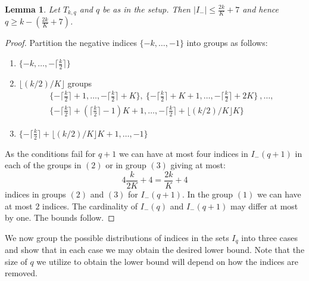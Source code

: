 \documentclass[11pt]{article}
\newtheorem{lemma}[theorem]{Lemma}
\begin{document}
\begin{lemma}\label{lem:belowsmall} Let $T_{k,q}$ and $q$ be as in the setup.
Then  $|I_-|\leq \frac{2k}{K}+7$ and hence
$q\geq k-(\frac{2k}{K}+7)$.
\end{lemma}
\begin{proof}
Partition  the negative indices $\{-k,\ldots, -1\}$  into groups  as follows:
\begin{enumerate}
\item $\{-k,\ldots, -\lceil \frac k2\rceil\}$
\item $\lfloor (k/2)/K\rfloor$ groups 
\begin{align*}\{-\lceil \frac k2\rceil+1,\ldots, -\lceil \frac k2\rceil+K\},\ 
 \{-\lceil \frac k2\rceil+K+1,\ldots, -\lceil \frac k2\rceil+2K\} \ 
 ,\ldots, \\ 
 \{-\lceil \frac k2\rceil+(\lceil \frac k2\rceil -1)K+1,\ldots, -\lceil \frac k2\rceil+ \lfloor (k/2)/K\rfloor K\}
 \end{align*}
\item $\{-\lceil \frac k2\rceil+ \lfloor (k/2)/K\rfloor K+1,\ldots, -1\}$
\end{enumerate}
 As the conditions fail for $q+1$ we can have at most four indices in $I_-(q+1)$ in each of the groups in $(2)$ or in group $(3)$ giving at most:
\[4\frac{k}{2K}+4=\frac{2k}{K}+4\]
indices in groups $(2)$ and $(3)$ for $I_-(q+1)$. In the group $(1)$ we can have at most $2$ indices. 
The cardinality of $I_-(q)$ and $I_-(q+1)$ may differ at most by one. The bounds follow.
\end{proof}
We now group the possible distributions of indices in the %
sets $I_q$  %
into three
cases and show that in each case we may obtain the desired lower bound.
Note that the size of $q$ we utilize to obtain the lower bound will depend on
  how the indices are removed.
 
\end{document}

